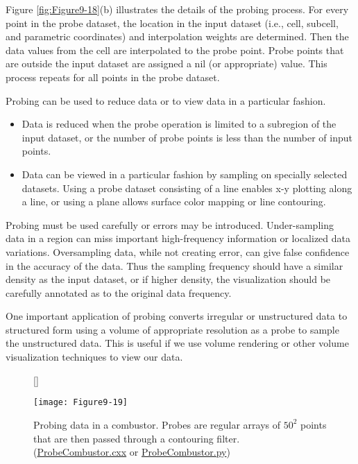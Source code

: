 Figure \ref{fig:Figure9-18}(b) illustrates the details of the probing process. For every point in the probe dataset, the location in the input dataset (i.e., cell, subcell, and parametric coordinates) and interpolation weights are determined. Then the data values from the cell are interpolated to the probe point. Probe points that are outside the input dataset are assigned a nil (or appropriate) value. This process repeats for all points in the probe dataset.

Probing can be used to reduce data or to view data in a particular fashion.

\begin{itemize}

\item Data is reduced when the probe operation is limited to a subregion of the input dataset, or the number of probe points is less than the number of input points.

\item Data can be viewed in a particular fashion by sampling on specially selected datasets. Using a probe dataset consisting of a line enables x-y plotting along a line, or using a plane allows surface color mapping or line contouring.

\end{itemize}

Probing must be used carefully or errors may be introduced. Under-sampling data in a region can miss important high-frequency information or localized data variations. Oversampling data, while not creating error, can give false confidence in the accuracy of the data. Thus the sampling frequency should have a similar density as the input dataset, or if higher density, the visualization should be carefully annotated as to the original data frequency.

One important application of probing converts irregular or unstructured data to structured form using a volume of appropriate resolution as a probe to sample the unstructured data. This is useful if we use volume rendering or other volume visualization techniques to view our data.

\begin{figure}[!htb]
	[\FBwidth]
	{\caption{Probing data in a combustor.  Probes are regular arrays of $50^2$ points that are then passed through a contouring filter.(\href{https://lorensen.github.io/VTKExamples/site/Cxx/VisualizationAlgorithms/ProbeCombustor/}{ProbeCombustor.cxx} or \href{https://lorensen.github.io/VTKExamples/site/Python/VisualizationAlgorithms/ProbeCombustor/}{ProbeCombustor.py})}\label{fig:Figure9-19}}
	{\texttt{[image: Figure9-19]}}
\end{figure}

